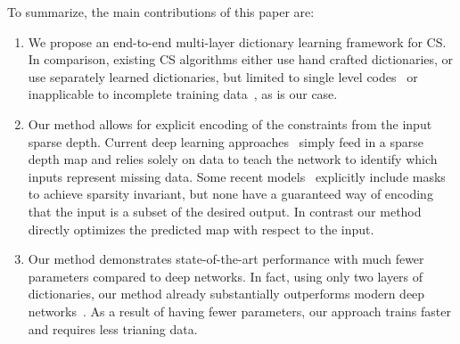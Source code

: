   To summarize, the main contributions of this paper are:
  \begin{enumerate}
    \item We propose an end-to-end multi-layer dictionary learning framework for CS. In comparison, existing CS algorithms either use hand crafted dictionaries, or use separately learned dictionaries, but limited to single level codes~\cite{} or inapplicable to incomplete training data~\cite{}, as is our case.

  
  \item Our method allows for explicit encoding of the constraints from the input sparse depth. Current deep learning approaches~\cite{} simply feed in a sparse depth map and relies solely on data to teach the network to identify which inputs represent missing data. Some recent models~\cite{} explicitly include masks to achieve sparsity invariant, but none have a guaranteed way of encoding that the input is a subset of the desired output. In contrast our method directly optimizes the predicted map with respect to the input.
  
      
  \item Our method demonstrates state-of-the-art performance with much fewer parameters compared to deep networks. In fact,  using only two layers of dictionaries, our method already substantially outperforms modern deep networks~\cite{}. As a result of having fewer parameters, our approach trains faster and requires less trianing data.
  
  \end{enumerate}
  